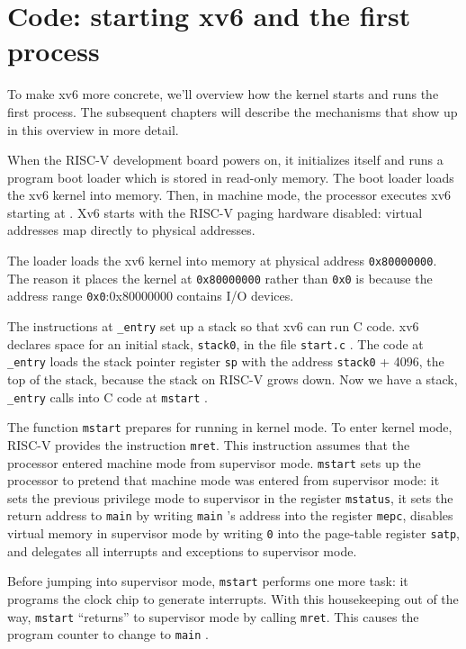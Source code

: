\section{Code: starting xv6 and the first process}
To make xv6 more concrete, we'll overview how the kernel starts and
runs the first process. The subsequent chapters will describe the
mechanisms that show up in this overview in more detail.

When the RISC-V development board powers on, it initializes
itself and runs a program boot loader which is stored in read-only
memory.  The boot loader loads the xv6 kernel into memory.  Then, in
machine mode, the processor executes xv6 starting at
.
Xv6 starts with the RISC-V paging hardware disabled:
virtual addresses map directly to physical addresses.

The loader loads the xv6 kernel into memory at physical address
\texttt{0x80000000}.
The reason it places the kernel at
\texttt{0x80000000}
rather than
\texttt{0x0}
is because the address range
\texttt{0x0}:0x80000000
contains I/O devices.

The instructions at
\lstinline{_entry}
set up a stack so that xv6 can run C code.
xv6 declares space for an initial stack,
\lstinline{stack0},
in the file
\lstinline{start.c}
.
The code at
\lstinline{_entry}
loads the stack pointer register
\texttt{sp}
with the address
\lstinline{stack0}
+ 4096, the top of the stack, because the stack
on RISC-V grows down.
Now we have a stack,
\lstinline{_entry}
calls into C code at
\lstinline{mstart}
.

The function
\lstinline{mstart}
prepares for running in kernel mode.
To enter kernel mode, RISC-V
provides the instruction
\lstinline{mret}.
This instruction assumes that the processor
entered machine mode from supervisor mode.
\lstinline{mstart}
sets up the processor to pretend
that machine mode was entered
from supervisor mode:
it sets the previous privilege mode to
supervisor in the register
\lstinline{mstatus},
it sets the return address to
\lstinline{main}
by writing
\lstinline{main} 's
address into
the register
\lstinline{mepc},
disables virtual memory in supervisor mode
by writing
\lstinline{0}
into the page-table register
\lstinline{satp},
and delegates all interrupts and exceptions
to supervisor mode.

Before jumping into supervisor mode,
\lstinline{mstart}
performs one more task: it programs the clock
chip to generate interrupts.
With this housekeeping out of the way,
\lstinline{mstart}
``returns'' to supervisor
mode by calling
\lstinline{mret}.
This causes the program counter to change
to
\lstinline{main}
.

